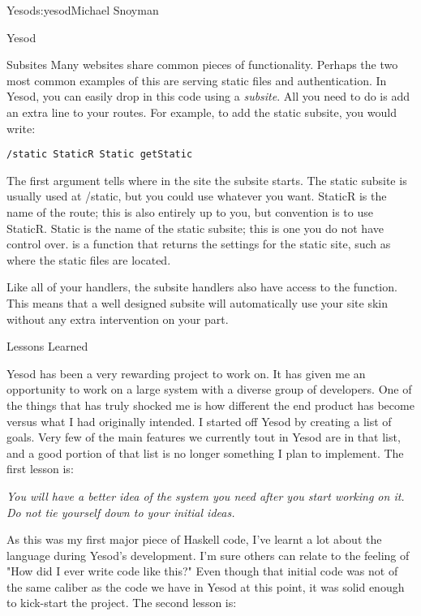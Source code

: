 \begin{aosachapter}{Yesod}{s:yesod}{Michael Snoyman}
\begin{aosasect1}{Yesod}
\begin{aosasect2}{Subsites}
Many websites share common pieces of functionality. Perhaps the two
most common examples of this are serving static files and
authentication. In Yesod, you can easily drop in this code using a
\emph{subsite}. All you need to do is add an extra line to your
routes. For example, to add the static subsite, you would write:

\begin{verbatim}
/static StaticR Static getStatic
\end{verbatim}

The first argument tells where in the site the subsite starts. The
static subsite is usually used at /static, but you could use whatever
you want. StaticR is the name of the route; this is also entirely up
to you, but convention is to use StaticR. Static is the name of the
static subsite; this is one you do not have control
over.  is a function that returns the settings for the
static site, such as where the static files are located.

Like all of your handlers, the subsite handlers also have access to
the  function. This means that a well designed
subsite will automatically use your site skin without any extra
intervention on your part.

\end{aosasect2}

\end{aosasect1}

\begin{aosasect1}{Lessons Learned}

Yesod has been a very rewarding project to work on. It has given me an
opportunity to work on a large system with a diverse group of
developers. One of the things that has truly shocked me is how
different the end product has become versus what I had originally
intended. I started off Yesod by creating a list of goals. Very few of
the main features we currently tout in Yesod are in that list, and a
good portion of that list is no longer something I plan to
implement. The first lesson is:

\emph{You will have a better idea of the system you need after you
  start working on it. Do not tie yourself down to your initial
  ideas.}

As this was my first major piece of Haskell code, I've learnt a lot
about the language during Yesod's development. I'm sure others can
relate to the feeling of "How did I ever write code like this?" Even
though that initial code was not of the same caliber as the code we
have in Yesod at this point, it was solid enough to kick-start the
project. The second lesson is:


\end{aosasect1}
\end{aosachapter}
